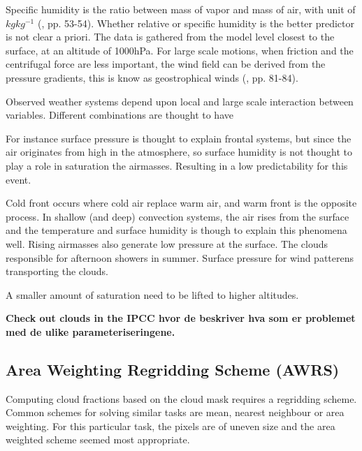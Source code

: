 Specific humidity is the ratio between mass of vapor and mass of air, with unit of $kg kg^{-1}$ (\cite{lohmann2016}, pp. 53-54). Whether relative or specific humidity is the better predictor is not clear a priori. The data is gathered from the model level closest to the surface, at an altitude of 1000hPa. For large scale motions, when friction and the centrifugal force are less important, the wind field can be derived from the pressure gradients, this is know as geostrophical winds  (\cite{lohmann2016}, pp. 81-84).

Observed weather systems depend upon local and large scale interaction between variables. Different combinations are thought to have 

For instance surface pressure is thought to explain frontal systems, but since the air originates from high in the atmosphere, so surface humidity is not thought to play a role in saturation the airmasses. Resulting in a low predictability for this event. 

Cold front occurs where cold air replace warm air, and warm front is the opposite process. In shallow (and deep) convection systems, the air rises from the surface and the temperature and surface humidity is though to explain this phenomena well. Rising airmasses also generate low pressure at the surface. The clouds responsible for afternoon showers in summer. Surface pressure for wind patterens transporting the clouds. 

A smaller amount of saturation need to be lifted to higher altitudes.

\textbf{Check out clouds in the IPCC hvor de beskriver hva som er problemet med de ulike parameteriseringene.}

\subsection{Area Weighting Regridding Scheme (AWRS)} \label{sec:remapping}
Computing cloud fractions based on the cloud mask requires a regridding scheme. Common schemes for solving similar tasks are mean, nearest neighbour or area weighting. For this particular task, the pixels are of uneven size and the area weighted scheme seemed most appropriate. 

